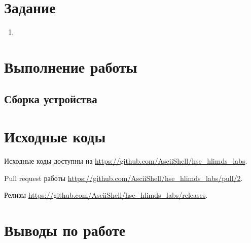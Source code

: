 \documentclass[a4paper,14pt]{article}
\begin{document}
    
    \tableofcontents
    \pagebreak


    \section{Задание}

    \begin{enumerate}
        \item
    \end{enumerate}


    \section{Выполнение работы}

    \subsection{Сборка устройства}


    \section{Исходные коды}

    Исходные коды доступны на \href{https://github.com/AsciiShell/hse_hlimds_labs}
    {https://github.com/AsciiShell/hse\_hlimds\_labs}.

    Pull request работы \href{https://github.com/AsciiShell/hse_hlimds_labs/pull/2}
    {https://github.com/AsciiShell/hse\_hlimds\_labs/pull/2}.

    Релизы \href{https://github.com/AsciiShell/hse_hlimds_labs/releases}
    {https://github.com/AsciiShell/hse\_hlimds\_labs/releases}.


    \section{Выводы по работе}
\end{document}
